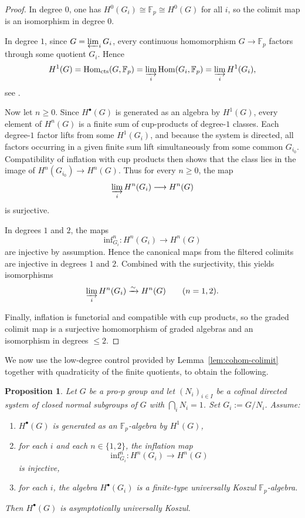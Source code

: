 \documentclass[11pt]{amsart}
\numberwithin{equation}{section}
\newtheorem{proposition}[theorem]{Proposition}
\theoremstyle{definition}
\begin{document}
	\begin{proof}
		In degree \(0\), one has \(H^0(G_i)\cong \mathbb F_p\cong H^0(G)\) for all \(i\), so the colimit map is an isomorphism in degree \(0\).
		
		In degree \(1\), since \(G=\varprojlim_i G_i\), every continuous homomorphism \(G\to \mathbb{F}_p\) factors through some quotient \(G_i\). Hence 
		\[H^1(G)=\mathrm{Hom}_{\mathrm{cts}}(G,\mathbb{F}_p) =\varinjlim_i \mathrm{Hom}(G_i,\mathbb{F}_p) =\varinjlim_i H^1(G_i),\]
		see \cite[Prop.~1.5.1]{NeukirchSchmidtWingberg}.
		
		Now let \(n\ge 0\). Since \(H^\bullet(G)\) is generated as an algebra by \(H^1(G)\), every element of \(H^n(G)\) is a finite sum of cup-products of degree-$1$ classes. Each degree-$1$ factor lifts from some \(H^1(G_i)\), and because the system is directed, all factors occurring in a given finite sum lift simultaneously from some common \(G_{i_0}\). Compatibility of inflation with cup products then shows that the class lies in the image of \(H^n(G_{i_0})\to H^n(G)\). Thus for every \(n\ge 0\), the map 
		\[ \varinjlim_i H^n(G_i)\longrightarrow H^n(G)\]
		is surjective.
		
		In degrees \(1\) and \(2\), the maps \[ \mathrm{inf}^n_{G_i}\colon H^n(G_i)\to H^n(G) \]
		are injective by assumption. Hence the canonical maps from the filtered colimits are injective in degrees \(1\) and \(2\). Combined with the surjectivity, this yields isomorphisms
		\[\varinjlim_i H^n(G_i)\xrightarrow{\sim} H^n(G) \qquad (n=1,2).\]
		
		Finally, inflation is functorial and compatible with cup products, so the graded colimit map is a surjective homomorphism of graded algebras and an isomorphism in degrees \(\le 2\).
	\end{proof}
	
	We now use the low-degree control provided by Lemma~\ref{lem:cohom-colimit} together with quadraticity of the finite quotients, to obtain the following.
	
	\begin{proposition}\label{prop:galois}
		Let \(G\) be a pro-\(p\) group and let \((N_i)_{i\in I}\) be a cofinal directed system of closed normal subgroups of \(G\) with \(\bigcap_i N_i=1\). Set \(G_i:=G/N_i\). Assume:
		\begin{enumerate}[label=(\roman*)]
			\item \(H^\bullet(G)\) is generated as an \(\mathbb{F}_p\)-algebra by \(H^1(G)\),
			\item for each \(i\) and each \(n\in\{1,2\}\), the inflation map
			\[\mathrm{inf}^n_{G_i}\colon H^n(G_i)\longrightarrow H^n(G)\]
			is injective,
			\item for each \(i\), the algebra \(H^\bullet(G_i)\) is a finite-type universally Koszul \(\mathbb{F}_p\)-algebra.
		\end{enumerate}
		Then \(H^\bullet(G)\) is asymptotically universally Koszul.
	\end{proposition}
	
\end{document}
